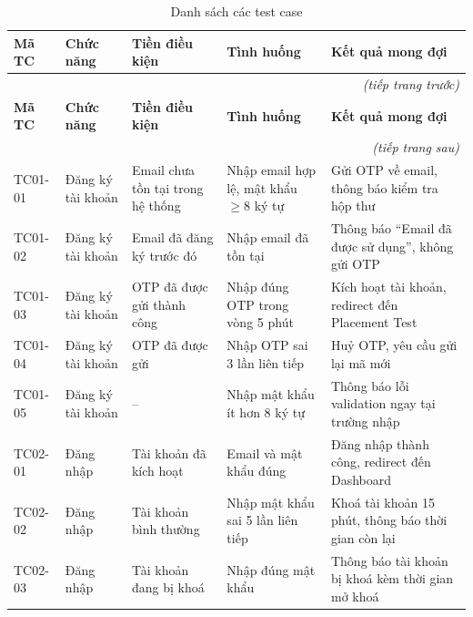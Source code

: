 \documentclass[a4paper,12pt]{extreport}
\begin{document}
\renewcommand{\arraystretch}{1.2}
\begin{longtable}{|p{1.3cm}|p{2.8cm}|p{2.8cm}|p{4.0cm}|p{3.0cm}|}
    \caption{Danh sách các test case}
    \label{tab:testcase_list} \\
    \hline
    \textbf{Mã TC} & \textbf{Chức năng} & \textbf{Tiền điều kiện} & \textbf{Tình huống} & \textbf{Kết quả mong đợi} \\ \hline
    \endfirsthead
    \multicolumn{5}{r}{\textit{(tiếp trang trước)}} \\
    \hline
    \textbf{Mã TC} & \textbf{Chức năng} & \textbf{Tiền điều kiện} & \textbf{Tình huống} & \textbf{Kết quả mong đợi} \\ \hline
    \endhead
    \hline \multicolumn{5}{r}{\textit{(tiếp trang sau)}} \\
    \endfoot
    \hline
    \endlastfoot

    TC01-01 & Đăng ký tài khoản & Email chưa tồn tại trong hệ thống & Nhập email hợp lệ, mật khẩu $\geq$8 ký tự & Gửi OTP về email, thông báo kiểm tra hộp thư \\ \hline

    TC01-02 & Đăng ký tài khoản & Email đã đăng ký trước đó & Nhập email đã tồn tại & Thông báo ``Email đã được sử dụng'', không gửi OTP \\ \hline

    TC01-03 & Đăng ký tài khoản & OTP đã được gửi thành công & Nhập đúng OTP trong vòng 5 phút & Kích hoạt tài khoản, redirect đến Placement Test \\ \hline

    TC01-04 & Đăng ký tài khoản & OTP đã được gửi & Nhập OTP sai 3 lần liên tiếp & Huỷ OTP, yêu cầu gửi lại mã mới \\ \hline

    TC01-05 & Đăng ký tài khoản & -- & Nhập mật khẩu ít hơn 8 ký tự & Thông báo lỗi validation ngay tại trường nhập \\ \hline

    TC02-01 & Đăng nhập & Tài khoản đã kích hoạt & Email và mật khẩu đúng & Đăng nhập thành công, redirect đến Dashboard \\ \hline

    TC02-02 & Đăng nhập & Tài khoản bình thường & Nhập mật khẩu sai 5 lần liên tiếp & Khoá tài khoản 15 phút, thông báo thời gian còn lại \\ \hline

    TC02-03 & Đăng nhập & Tài khoản đang bị khoá & Nhập đúng mật khẩu & Thông báo tài khoản bị khoá kèm thời gian mở khoá \\ \hline


\end{longtable}
\end{document}
